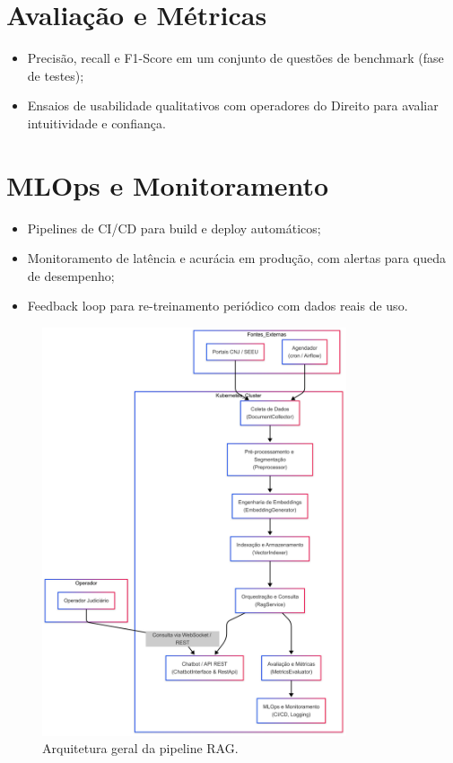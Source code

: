 \section{Avaliação e Métricas}
\begin{itemize}[label=\textbullet]
  \item Precisão, recall e F1-Score em um conjunto de questões de benchmark (fase de testes);
  \item Ensaios de usabilidade qualitativos com operadores do Direito para avaliar intuitividade e confiança.
\end{itemize}

\section{MLOps e Monitoramento}
\begin{itemize}[label=\textbullet]
  \item Pipelines de CI/CD para build e deploy automáticos;
  \item Monitoramento de latência e acurácia em produção, com alertas para queda de desempenho;
  \item Feedback loop para re-treinamento periódico com dados reais de uso.
\end{itemize}

\begin{figure}[h!]
  \centering
  \includegraphics[width=0.8\textwidth]{04-figuras/arquitetura_pipeline.png}
  \caption{Arquitetura geral da pipeline RAG.}
  \label{fig:arquitetura_pipeline}
\end{figure}


